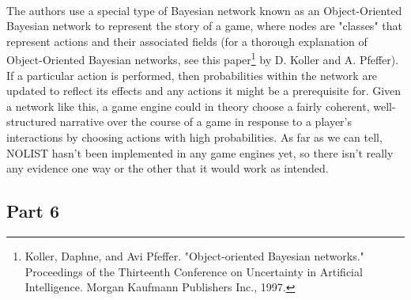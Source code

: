 \documentclass[11pt]{article}
\begin{document}
\begin{itemize}
\\ The authors use a special type of Bayesian network known as an Object-Oriented Bayesian network to represent the story of a game, where nodes are "classes" that represent actions and their associated fields (for a thorough explanation of Object-Oriented Bayesian networks, see this paper\footnote{Koller, Daphne, and Avi Pfeffer. "Object-oriented Bayesian networks." Proceedings of the Thirteenth Conference on Uncertainty in Artificial Intelligence. Morgan Kaufmann Publishers Inc., 1997.} by D. Koller and A. Pfeffer). If a particular action is performed, then probabilities within the network are updated to reflect its effects and any actions it might be a prerequisite for. Given a network like this, a game engine could in theory choose a fairly coherent, well-structured narrative over the course of a game in response to a player's interactions by choosing actions with high probabilities. As far as we can tell, NOLIST hasn't been implemented in any game engines yet, so there isn't really any evidence one way or the other that it would work as intended. 
\end{itemize}
\subsection*{Part 6}
\end{document}
